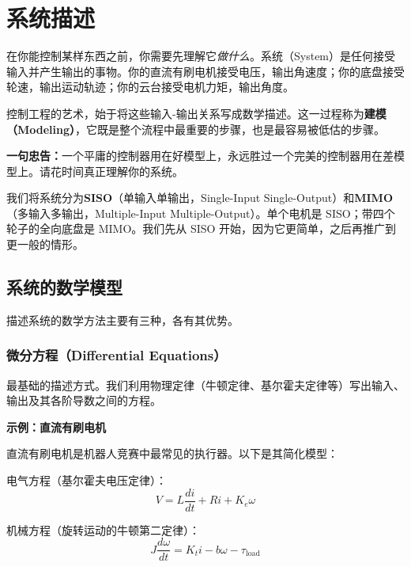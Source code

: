 \section{系统描述}

在你能控制某样东西之前，你需要先理解它\textit{做什么}。系统（System）是任何接受输入并产生输出的事物。你的直流有刷电机接受电压，输出角速度；你的底盘接受轮速，输出运动轨迹；你的云台接受电机力矩，输出角度。

控制工程的艺术，始于将这些输入-输出关系写成数学描述。这一过程称为\textbf{建模（Modeling）}，它既是整个流程中最重要的步骤，也是最容易被低估的步骤。

\textbf{一句忠告：}一个平庸的控制器用在好模型上，永远胜过一个完美的控制器用在差模型上。请花时间真正理解你的系统。

我们将系统分为\textbf{SISO}（单输入单输出，Single-Input Single-Output）和\textbf{MIMO}（多输入多输出，Multiple-Input Multiple-Output）。单个电机是 SISO；带四个轮子的全向底盘是 MIMO。我们先从 SISO 开始，因为它更简单，之后再推广到更一般的情形。

\subsection{系统的数学模型}

描述系统的数学方法主要有三种，各有其优势。

\subsubsection{微分方程（Differential Equations）}

最基础的描述方式。我们利用物理定律（牛顿定律、基尔霍夫定律等）写出输入、输出及其各阶导数之间的方程。

\textbf{示例：直流有刷电机}

直流有刷电机是机器人竞赛中最常见的执行器。以下是其简化模型：

电气方程（基尔霍夫电压定律）：
\begin{equation}
V = L \frac{di}{dt} + Ri + K_e \omega
\end{equation}

机械方程（旋转运动的牛顿第二定律）：
\begin{equation}
J \frac{d\omega}{dt} = K_t i - b\omega - \tau_{\text{load}}
\end{equation}

